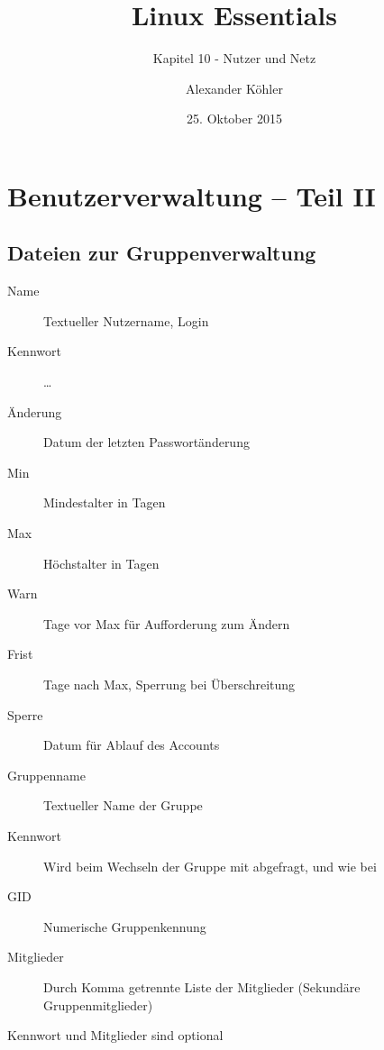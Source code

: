 \documentclass[aspectratio=43]{beamer}
\title[Linux Essentials  - Kapitel 10 - Nutzer und Netz]{Linux Essentials}
\subtitle{Kapitel 10 - Nutzer und Netz}
\author{Alexander Köhler}
\date{25. Oktober 2015}
\begin{document}
\logoframe

\frame{\titlepage}



\setcounter{tocdepth}{1}
\section[Gliederung]{}
\frame{\tableofcontents}


\section{Benutzerverwaltung -- Teil II}
\subsection{Dateien zur Gruppenverwaltung}
\begin{frame}{}
  \begin{center}
    \colorbox{yellow}{}
  \end{center}
  \begin{block}{}
    \begin{description}
      \item[Name]        Textueller Nutzername, Login
      \item[Kennwort]    \dots
      \item[Änderung]    Datum der letzten Passwortänderung
      \item[Min]         Mindestalter in Tagen
      \item[Max]         Höchstalter in Tagen
      \item[Warn]        Tage vor Max für Aufforderung zum Ändern 
      \item[Frist]       Tage nach Max, Sperrung bei Überschreitung
      \item[Sperre]      Datum für Ablauf des Accounts
    \end{description}
  \end{block}
\end{frame}
\begin{frame}{}
  \begin{center}
    \colorbox{yellow}{}
  \end{center}
  \begin{block}{}
    \begin{description}
      \item[Gruppenname] Textueller Name der Gruppe
      \item[Kennwort]    Wird beim Wechseln der Gruppe mit  abgefragt, \co{*} und  wie bei  
      \item[GID]         Numerische Gruppenkennung
      \item[Mitglieder]  Durch Komma getrennte Liste der Mitglieder (Sekundäre Gruppenmitglieder)
    \end{description}
  \end{block}
    Kennwort und Mitglieder sind optional
\end{frame}
\end{document}
